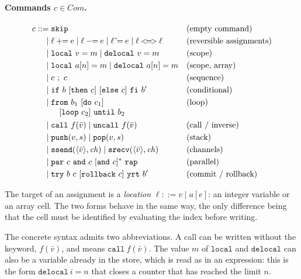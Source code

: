 \paragraph{Commands $c \in \mathit{Com}$.}
\begin{align*}
c ::={}& \mathtt{skip} && \text{(empty command)}\\
   \mid{}& \ell \mathbin{+\!\!=} e \mid \ell \mathbin{-\!\!=} e \mid \ell \mathbin{\hat{}\!=} e \mid \ell \mathbin{<\!=\!>} \ell && \text{(reversible assignments)}\\
   \mid{}& \mathtt{local}\ v = m \mid \mathtt{delocal}\ v = m && \text{(scope)}\\
   \mid{}& \mathtt{local}\ a[n] = m \mid \mathtt{delocal}\ a[n] = m && \text{(scope, array)}\\
   \mid{}& c\ ;\ c && \text{(sequence)}\\
   \mid{}& \mathtt{if}\ b\ [\mathtt{then}\ c]\ [\mathtt{else}\ c]\ \mathtt{fi}\ b' && \text{(conditional)}\\
   \mid{}& \begin{array}[t]{@{}l@{}}\mathtt{from}\ b_1\ [\mathtt{do}\ c_1]\\ \quad[\mathtt{loop}\ c_2]\ \mathtt{until}\ b_2\end{array} && \text{(loop)}\\
   \mid{}& \mathtt{call}\ f(\bar v) \mid \mathtt{uncall}\ f(\bar v) && \text{(call / inverse)}\\
   \mid{}& \mathtt{push}(v,s) \mid \mathtt{pop}(v,s) && \text{(stack)}\\
   \mid{}& \mathtt{ssend}(\langle \bar v \rangle, \mathit{ch}) \mid \mathtt{srecv}(\langle \bar v \rangle, \mathit{ch}) && \text{(channels)}\\
   \mid{}& \mathtt{par}\ c\ \mathtt{and}\ c\ [\mathtt{and}\ c]^{*}\ \mathtt{rap} && \text{(parallel)}\\
   \mid{}& \mathtt{try}\ b\ c\ [\mathtt{rollback}\ c]\ \mathtt{yrt}\ b' && \text{(commit / rollback)}
\end{align*}

\noindent
The target of an assignment is a \emph{location} $\ell ::= v \mid a[e]$: an
integer variable or an array cell. The two forms behave in the
same way, the only difference being that the cell must be identified by evaluating the
index before writing.

\noindent
The concrete syntax admits two abbreviations. A call can be written
without the keyword, $f(\bar v)$, and means $\mathtt{call}\ f(\bar v)$. The value
$m$ of $\mathtt{local}$ and $\mathtt{delocal}$ can also be a variable already
in the store, which is read as in an expression: this is the form
$\mathtt{delocal}\ i = n$ that closes a counter that has reached the limit $n$.

